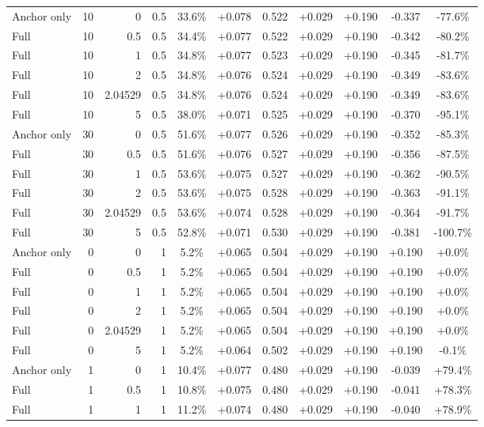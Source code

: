 \begin{table}[htbp]
\begin{tabular}{lrrrccccccc}
Anchor only & 10 & 0 & 0.5 & 33.6\% & +0.078 & 0.522 & +0.029 & +0.190 & -0.337 & -77.6\% \\
Full & 10 & 0.5 & 0.5 & 34.4\% & +0.077 & 0.522 & +0.029 & +0.190 & -0.342 & -80.2\% \\
Full & 10 & 1 & 0.5 & 34.8\% & +0.077 & 0.523 & +0.029 & +0.190 & -0.345 & -81.7\% \\
Full & 10 & 2 & 0.5 & 34.8\% & +0.076 & 0.524 & +0.029 & +0.190 & -0.349 & -83.6\% \\
Full & 10 & 2.04529 & 0.5 & 34.8\% & +0.076 & 0.524 & +0.029 & +0.190 & -0.349 & -83.6\% \\
Full & 10 & 5 & 0.5 & 38.0\% & +0.071 & 0.525 & +0.029 & +0.190 & -0.370 & -95.1\% \\
Anchor only & 30 & 0 & 0.5 & 51.6\% & +0.077 & 0.526 & +0.029 & +0.190 & -0.352 & -85.3\% \\
Full & 30 & 0.5 & 0.5 & 51.6\% & +0.076 & 0.527 & +0.029 & +0.190 & -0.356 & -87.5\% \\
Full & 30 & 1 & 0.5 & 53.6\% & +0.075 & 0.527 & +0.029 & +0.190 & -0.362 & -90.5\% \\
Full & 30 & 2 & 0.5 & 53.6\% & +0.075 & 0.528 & +0.029 & +0.190 & -0.363 & -91.1\% \\
Full & 30 & 2.04529 & 0.5 & 53.6\% & +0.074 & 0.528 & +0.029 & +0.190 & -0.364 & -91.7\% \\
Full & 30 & 5 & 0.5 & 52.8\% & +0.071 & 0.530 & +0.029 & +0.190 & -0.381 & -100.7\% \\
Anchor only & 0 & 0 & 1 & 5.2\% & +0.065 & 0.504 & +0.029 & +0.190 & +0.190 & +0.0\% \\
Full & 0 & 0.5 & 1 & 5.2\% & +0.065 & 0.504 & +0.029 & +0.190 & +0.190 & +0.0\% \\
Full & 0 & 1 & 1 & 5.2\% & +0.065 & 0.504 & +0.029 & +0.190 & +0.190 & +0.0\% \\
Full & 0 & 2 & 1 & 5.2\% & +0.065 & 0.504 & +0.029 & +0.190 & +0.190 & +0.0\% \\
Full & 0 & 2.04529 & 1 & 5.2\% & +0.065 & 0.504 & +0.029 & +0.190 & +0.190 & +0.0\% \\
Full & 0 & 5 & 1 & 5.2\% & +0.064 & 0.502 & +0.029 & +0.190 & +0.190 & -0.1\% \\
Anchor only & 1 & 0 & 1 & 10.4\% & +0.077 & 0.480 & +0.029 & +0.190 & -0.039 & +79.4\% \\
Full & 1 & 0.5 & 1 & 10.8\% & +0.075 & 0.480 & +0.029 & +0.190 & -0.041 & +78.3\% \\
Full & 1 & 1 & 1 & 11.2\% & +0.074 & 0.480 & +0.029 & +0.190 & -0.040 & +78.9\% \\

\end{tabular}
\end{table}
